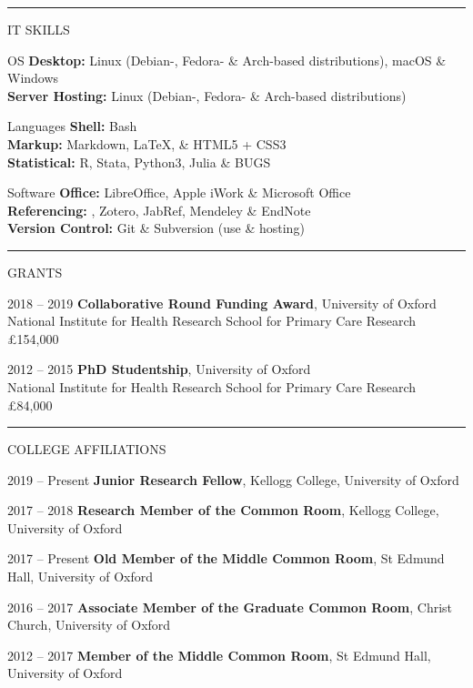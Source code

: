 \documentclass[10pt,a4paper]{article}
\begin{document}
\noindent\rule{\textwidth}{0.4pt}
\begin{cvlist}{IT SKILLS}
	
	\item[OS]
	\textbf{Desktop:} Linux (Debian-, Fedora- \& Arch-based distributions), macOS \& Windows \\
	\textbf{Server Hosting:} Linux (Debian-, Fedora- \& Arch-based distributions)
	
	\item[Languages]
	\textbf{Shell:} Bash \\
	\textbf{Markup:} Markdown, \LaTeX , \& HTML5 + CSS3 \\
	\textbf{Statistical:} R, Stata, Python3, Julia \& BUGS
	
	\item[Software]
	\textbf{Office:} LibreOffice, Apple iWork \& Microsoft Office \\
	\textbf{Referencing:} , Zotero, JabRef, Mendeley \& EndNote \\
	\textbf{Version Control:} Git \& Subversion (use \& hosting)
	
\end{cvlist}


\noindent\rule{\textwidth}{0.4pt}
\begin{cvlist}{GRANTS}
	
	\item[2018 -- 2019]
	\textbf{Collaborative Round Funding Award}, University of Oxford \\
	National Institute for Health Research School for Primary Care Research \\
	\pounds 154,000
	
	\item[2012 -- 2015]
	\textbf{PhD Studentship}, University of Oxford \\
	National Institute for Health Research School for Primary Care Research \\
	\pounds 84,000
	
\end{cvlist}


\noindent\rule{\textwidth}{0.4pt}
\begin{cvlist}{COLLEGE AFFILIATIONS}
	
	\item[2019 -- Present]
	\textbf{Junior Research Fellow}, Kellogg College, University of Oxford
	
	\item[2017 -- 2018]
	\textbf{Research Member of the Common Room}, Kellogg College, University of Oxford
	
	\item[2017 -- Present]
	\textbf{Old Member of the Middle Common Room}, St Edmund Hall, University of Oxford
	
	\item[2016 -- 2017]
	\textbf{Associate Member of the Graduate Common Room}, Christ Church, University of Oxford
	
	\item[2012 -- 2017]
	\textbf{Member of the Middle Common Room}, St Edmund Hall, University of Oxford
	
\end{cvlist}
\end{document}
